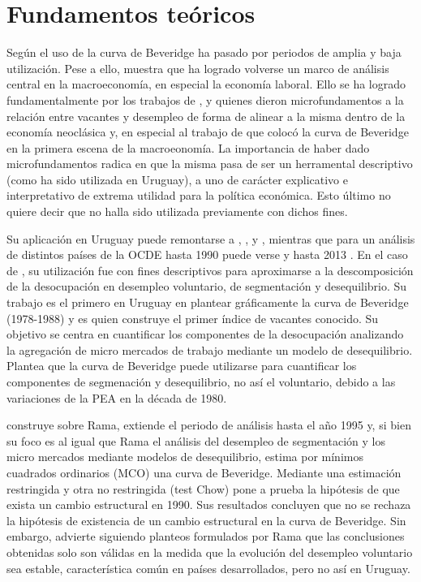 \chapter{Fundamentos teóricos}

Según \cite{Rodenburg2007} el uso de la curva de Beveridge ha pasado por periodos de amplia y baja utilización. Pese a ello, \cite{Elsby2015} muestra que ha logrado volverse un marco de análisis central en la macroeconomía, en especial la economía laboral. Ello se ha logrado fundamentalmente por los trabajos de \cite{Pissarides1985}, \cite{Mortensen1994} y \cite{Diamond1982} quienes dieron microfundamentos a la relación entre vacantes y desempleo de forma de alinear a la misma dentro de la economía neoclásica y, en especial al trabajo de \cite{Blanchard1989} que colocó la curva de Beveridge en la primera escena de la macroeonomía. La importancia de haber dado microfundamentos radica en que la misma pasa de ser un herramental descriptivo (como ha sido utilizada en Uruguay), a uno  de carácter explicativo e interpretativo de extrema utilidad para la política económica. Esto último no quiere decir que no halla sido utilizada previamente con dichos fines. 

Su aplicación en Uruguay puede remontarse a \cite{Rama1988}, \cite{DECON1993}, \cite{Urrestarazu1997} y \cite{Alma2011}, mientras que para un análisis de distintos países de la OCDE hasta 1990 puede verse \cite{Nickell2002} y hasta 2013 \cite{Hobijn2013}. En el caso de \cite{Rama1988}, su utilización fue con fines descriptivos para aproximarse a la descomposición de la desocupación en desempleo voluntario, de segmentación y desequilibrio. Su trabajo es el primero en Uruguay en plantear gráficamente la curva de Beveridge (1978-1988) y es quien construye el primer índice de vacantes conocido. Su objetivo se centra en cuantificar los componentes de la desocupación analizando la agregación de micro mercados de trabajo mediante un modelo de desequilibrio. Plantea que la curva de Beveridge puede utilizarse para cuantificar los componentes de segmenación y desequilibrio, no así el voluntario, debido a las variaciones de la PEA en la década de 1980.

\cite{Urrestarazu1997} construye sobre Rama, extiende el periodo de análisis hasta el año 1995 y, si bien su foco es al igual que Rama el análisis del desempleo de segmentación y los micro mercados mediante modelos de desequilibrio, estima por mínimos cuadrados ordinarios (MCO) una curva de Beveridge. Mediante una estimación restringida y otra no restringida (test Chow) pone a prueba la hipótesis de que exista un cambio estructural en 1990. Sus resultados concluyen que no se rechaza la hipótesis de existencia de un cambio estructural en la curva de Beveridge. Sin embargo, advierte siguiendo planteos formulados por Rama que las conclusiones obtenidas solo son válidas en la medida que la evolución del desempleo voluntario sea estable, característica común en países desarrollados, pero no así en Uruguay. 

